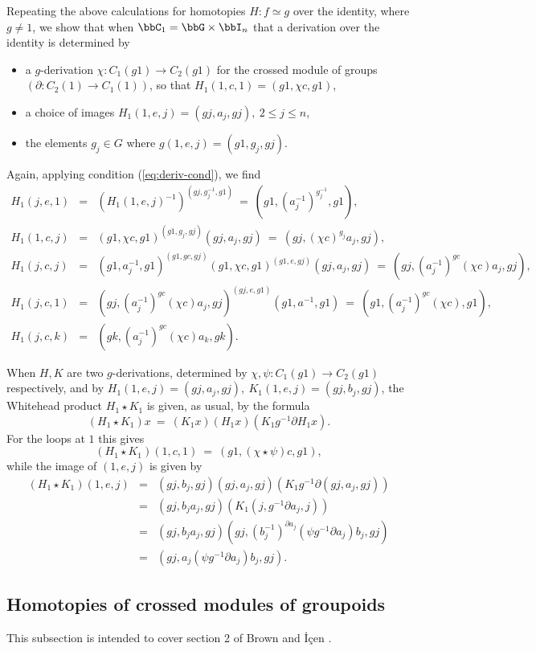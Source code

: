 \medskip
Repeating the above calculations for homotopies 
$H : f \simeq g$ over the identity, where $g \neq 1$, 
we show that when $\bbC_1 = \bbG \times \bbI_n$ that a derivation 
over the identity is determined by 
\begin{itemize}
\item
a $g$-derivation $\chi : C_1(g1) \to C_2(g1)$ 
for the crossed module of groups $(\partial : C_2(1) \to C_1(1))$, 
so that $H_1(1,c,1) = (g1,\chi c,g1)$, 
\item
a choice of images $H_1(1,e,j) = (gj,a_j,gj),~ 2 \leqslant j \leqslant n$, 
\item 
the elements $g_j \in G$ where $g(1,e,j) = (g1,g_j,gj)$. 
\end{itemize}
Again, applying condition (\ref{eq:deriv-cond}), we find 
\begin{eqnarray*}
H_1(j,e,1) &=& (H_1(1,e,j)^{-1})^{(gj,g_j^{-1},g1)} 
               ~=~ (g1,(a_j^{-1})^{g_j^{-1}},g1), \\
H_1(1,c,j) &=& (g1,\chi c,g1)^{(g1,g_j,gj)}(gj,a_j,gj) 
               ~=~ (gj,(\chi c)^{g_j}a_j,gj), \\
H_1(j,c,j) &=& (g1,a_j^{-1},g1)^{(g1,gc,gj)}(g1,\chi c,g1)^{(g1,e,gj)}(gj,a_j,gj) 
               ~=~ (gj,(a_j^{-1})^{gc}(\chi c)a_j,gj), \\
H_1(j,c,1) &=& (gj,(a_j^{-1})^{gc}(\chi c)a_j,gj)^{(gj,e,g1)}(g1,a^{-1},g1) 
               ~=~ (g1,(a_j^{-1})^{gc}(\chi c),g1), \\
H_1(j,c,k) &=& (gk,(a_j^{-1})^{gc}(\chi c)a_k,gk). 
\end{eqnarray*}

\noindent 
When $H,K$ are two $g$-derivations, 
determined by $\chi,\psi : C_1(g1) \to C_2(g1)$ respectively, 
and by $H_1(1,e,j) = (gj,a_j,gj),~ K_1(1,e,j) = (gj,b_j,gj)$, 
the Whitehead product $H_1 \star K_1$ is given, as usual, by the formula 
$$
(H_1 \star K_1)x ~=~ (K_1 x)(H_1 x)(K_1 g^{-1} \partial H_1 x). 
$$
For the loops at $1$ this gives 
$$
(H_1 \star K_1)(1,c,1) ~=~ (g1, (\chi\star\psi)c, g1),  
$$
while the image of $(1,e,j)$ is given by 
\begin{eqnarray*}
(H_1 \star K_1)(1,e,j) 
  &=&  (gj,b_j,gj)(gj,a_j,gj)(K_1 g^{-1}\partial(gj,a_j,gj)) \\
  &=&  (gj,b_ja_j,gj)(K_1(j,g^{-1}\partial a_j,j)) \\
  &=&  (gj,b_ja_j,gj)(gj,(b_j^{-1})^{\partial a_j}(\psi g^{-1}\partial a_j)b_j,gj) \\
  &=&  (gj,a_j(\psi g^{-1} \partial a_j)b_j,gj).
\end{eqnarray*}









\subsection{Homotopies of crossed modules of groupoids}

This subsection is intended to cover section 2 of
Brown and \.{I}\c{c}en \cite{brow:icen}.


